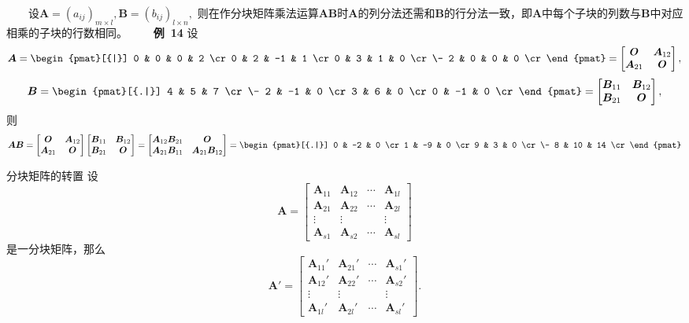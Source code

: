 \documentclass[compress,mathserif,cjk]{beamer}
\theoremstyle{remark}
\numberwithin{equation}{section}
\newcommand{\hei}{\bf}      %
\begin{document}
\begin{CJK}{UTF8}{gbsn}
\begin{frame}
\ \ \ \ 设$\bm A=(a_{ij})_{m\times l},\bm B=(b_{ij})_{l\times n},$ 则在作分块矩阵乘法运算$\bm{AB}$时$\bm A$的列分法还需和$\bm B$的行分法一致，即$\bm A$中每个子块的列数与$\bm B$中对应相乘的子块的行数相同。
\pause\vskip 5pt
\ \ \ \ {\hei 例~14} 设
$$\bm A=\begin{pmat}[{|}]
0 & 0 & 0 & 2 \cr
0 & 2 & -1 & 1 \cr
0 & 3 & 1 & 0 \cr\-
2 & 0 & 0 & 0 \cr
\end{pmat}=\left[\begin{matrix}\bm O&\bm A_{12}\\\bm A_{21}&\bm O\end{matrix}\right],$$
$$\bm B=\begin{pmat}[{.|}]
4 & 5 & 7 \cr\-
2 & -1 & 0 \cr
3 & 6 & 0 \cr
0 & -1 & 0 \cr
\end{pmat}=\left[\begin{matrix}\bm B_{11}&\bm B_{12}\\\bm B_{21}&\bm O\end{matrix}\right],$$
则\small
$$\bm{AB}=\left[\begin{matrix}\bm O&\bm A_{12}\\\bm A_{21}&\bm O\end{matrix}\right]\left[\begin{matrix}\bm B_{11}&\bm B_{12}\\\bm B_{21}&\bm O\end{matrix}\right]
=\left[\begin{matrix}\bm A_{12}\bm B_{21}&\bm O\\\bm A_{21}\bm B_{11}&\bm A_{21}\bm B_{12}\end{matrix}\right]
=\begin{pmat}[{.|}]
0 & -2 & 0 \cr
1 & -9 & 0 \cr
9 & 3 & 0 \cr\-
8 & 10 & 14 \cr
\end{pmat}$$
\end{frame}

\begin{frame}{分块矩阵的转置}
设
$$\bm A=\left[\begin{matrix}\bm A_{11}&\bm A_{12}&\cdots& \bm A_{1l}\\\bm A_{21}&\bm A_{22}&\cdots& \bm A_{2l}\\ \vdots&\vdots&&\vdots\\
\bm A_{s1}&\bm A_{s2}&\cdots& \bm A_{sl}\end{matrix}\right]$$
是一分块矩阵，那么
$$\bm A'=\left[\begin{matrix}\bm A_{11}'&\bm A_{21}'&\cdots& \bm A_{s1}'\\\bm A_{12}'&\bm A_{22}'&\cdots& \bm A_{s2}'\\ \vdots&\vdots&&\vdots\\
\bm A_{1l}'&\bm A_{2l}'&\cdots& \bm A_{sl}'\end{matrix}\right].$$
\end{frame}


\end{CJK}
\end{document}
